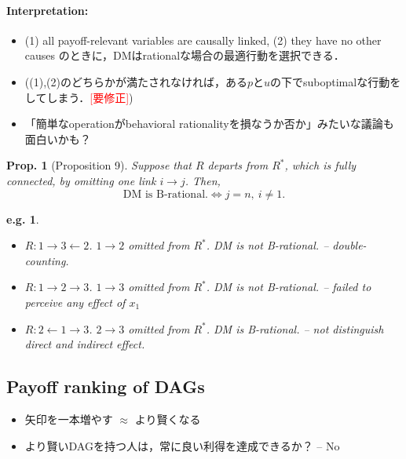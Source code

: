 \documentclass[11pt,a4paper,dvipdfmx]{article}
\theoremstyle{plain}
\newtheorem{prop}{Prop.}[section]
\newtheorem{eg}{e.g.}[section]
\newcommand{\equi}{\Longleftrightarrow}
\newcommand{\ocomment}[1]{{\textcolor{red}{#1}}}
\begin{document}
\paragraph{Interpretation:}
\begin{itemize}
	\item (1) all payoff-relevant variables are causally linked, (2) they have no other causes のときに，DMはrationalな場合の最適行動を選択できる．
	\item ((1),(2)のどちらかが満たされなければ，ある$p$と$u$の下でsuboptimalな行動をしてしまう．\ocomment{[要修正]})
	\item 「簡単なoperationがbehavioral rationalityを損なうか否か」みたいな議論も面白いかも？
\end{itemize}

\begin{prop}[Proposition 9] \label{one-link}
	Suppose that $R$ departs from $R^*$, which is fully connected, by omitting one link $i \to j$. Then, \\
	$$
	\text{DM is B-rational.} \equi j=n, \ i \neq 1. 
	$$
\end{prop}
\begin{eg}
	\begin{itemize}
		\item $R: 1 \to 3 \leftarrow 2$. $1 \to 2$ omitted from $R^*$. DM is not B-rational. -- double-counting.
		\item $R: 1 \to 2 \to 3$. $1 \to 3$ omitted from $R^*$. DM is not B-rational.
		-- failed to perceive any effect of $x_1$
		\item $R: 2 \leftarrow 1 \to 3$. $2 \to 3$ omitted from $R^*$. DM is B-rational.
		-- not distinguish direct and indirect effect.
	\end{itemize}
\end{eg}



\newpage
\subsection{Payoff ranking of DAGs}
\begin{screen}
	\begin{itemize}
	\item 矢印を一本増やす $\approx$ より賢くなる
	\item より賢いDAGを持つ人は，常に良い利得を達成できるか？ -- No
	\end{itemize}
\end{screen}
\end{document}

